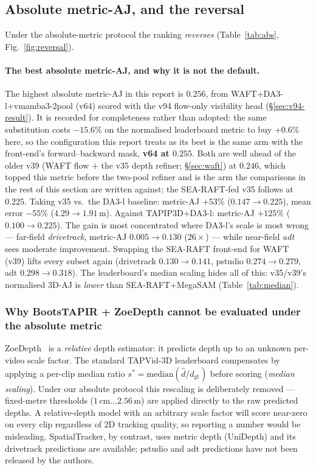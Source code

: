 \documentclass[11pt,a4paper]{article}
\begin{document}
\subsection{Absolute metric-AJ, and the reversal}
\label{sec:abs}
Under the absolute-metric protocol the ranking \emph{reverses} (Table~\ref{tab:abs},
Fig.~\ref{fig:reversal}).

\paragraph{The best absolute metric-AJ, and why it is not the default.}
The highest absolute metric-AJ in this report is $0.256$, from
\mbox{WAFT+DA3-l+vmamba3-2pool} (v64) scored with the v94 flow-only visibility head
(\S\ref{sec:v94-result}). It is recorded for completeness rather than adopted: the same
substitution costs $-15.6\%$ on the normalised leaderboard metric to buy $+0.6\%$ here, so the
configuration this report treats as its best is the same arm with the front-end's
forward--backward mask, \textbf{v64 at $0.255$}. Both are well ahead of the older v39
(WAFT flow $+$ the v35 depth refiner; \S\ref{sec:waft}) at $0.246$, which topped this metric
before the two-pool refiner and is the arm the comparisons in the rest of this section are
written against; the SEA-RAFT-fed v35 follows at $0.225$. Taking v35 vs.\ the DA3-l baseline: metric-AJ $+53\%$ ($0.147\!\to\!0.225$),
mean error $-55\%$ ($4.29\!\to\!1.91$\,m). Against TAPIP3D$+$DA3-l: metric-AJ
$+125\%$ ($0.100\!\to\!0.225$). The gain is most concentrated where DA3-l's scale is most
wrong --- far-field \emph{drivetrack}, metric-AJ $0.005\!\to\!0.130$ ($26\times$) ---
while near-field \emph{adt} sees moderate improvement. Swapping the SEA-RAFT front-end for
WAFT (v39) lifts every subset again (drivetrack $0.130\!\to\!0.141$, pstudio $0.274\!\to\!0.279$,
adt $0.298\!\to\!0.318$).
The leaderboard's median scaling hides all of this: v35/v39's normalised 3D-AJ is
\emph{lower} than SEA-RAFT$+$MegaSAM (Table~\ref{tab:median}).


\subsubsection*{Why BootsTAPIR + ZoeDepth cannot be evaluated under the absolute metric}
\label{sec:abs-na}
ZoeDepth~\cite{zoedepth} is a \emph{relative} depth estimator: it predicts depth up to an
unknown per-video scale factor. The standard TAPVid-3D leaderboard compensates by applying a
per-clip median ratio $s^{*} = \mathrm{median}(\hat{d} / d_{\mathrm{gt}})$ before scoring
(\emph{median scaling}). Under our absolute protocol this rescaling is deliberately removed ---
fixed-metre thresholds ($1\,\text{cm}\ldots 2.56\,\text{m}$) are applied directly to the raw
predicted depths. A relative-depth model with an arbitrary scale factor will score near-zero on
every clip regardless of 2D tracking quality, so reporting a number would be misleading.
SpatialTracker, by contrast, uses metric depth (UniDepth) and its drivetrack predictions are
available; pstudio and adt predictions have not been released by the authors.
\end{document}
